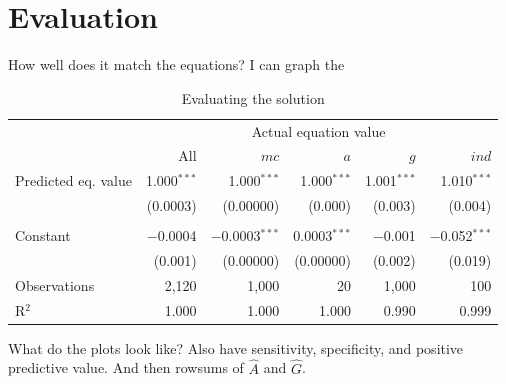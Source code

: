 \documentclass[12pt]{article}
\begin{document}
\section{Evaluation}

How well does it match the equations? I can graph the 

\begin{table}[htbp!] 
\centering 
\footnotesize
  \caption{Evaluating the solution} 
  \label{}
\begin{tabular}{l rrrrr} 
\vspace{-4ex} \\
\toprule
& \multicolumn{5}{c}{Actual equation value} \\ 
& All & $mc$ & $a$ & $g$ & $ind$ \\ 
\midrule
 Predicted eq. value & 1.000$^{***}$ & 1.000$^{***}$ & 1.000$^{***}$ & 1.001$^{***}$ & 1.010$^{***}$ \\ 
  & (0.0003) & (0.00000) & (0.000) & (0.003) & (0.004) \\ 
  & & & & & \\ 
 Constant & $-$0.0004 & $-$0.0003$^{***}$ & 0.0003$^{***}$ & $-$0.001 & $-$0.052$^{***}$ \\ 
  & (0.001) & (0.00000) & (0.00000) & (0.002) & (0.019) \\ 
\midrule
Observations & 2,120 & 1,000 & 20 & 1,000 & 100 \\ 
R$^{2}$ & 1.000 & 1.000 & 1.000 & 0.990 & 0.999 \\ 
\bottomrule
\end{tabular} 
\end{table} 

What do the plots look like? Also have sensitivity, specificity, and positive predictive value. And then rowsums of $\hat{A}$ and $\hat{G}$.
\end{document}
